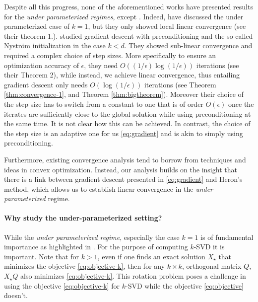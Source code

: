 Despite all this progress, none of the aforementioned works have presented results for the \emph{under parameterized regimes}, except \cite{chi2019nonconvex,li2024crucial}. Indeed, \cite{chi2019nonconvex} have discussed the under parameterized case of $k = 1$, but they only showed local linear convergence (see their theorem 1.). \cite{li2024crucial} studied gradient descent with preconditioning and the so-called Nyström initialization in the case $k < d$. They showed sub-linear convergence and required a complex choice of step sizes. More specifically to ensure an optimization accuracy of $\epsilon$, they need $O((1/\epsilon)\log(1/\epsilon))$ iterations (see their Theorem 2), while instead, we achieve linear convergence, thus entailing gradient descent only needs $O(\log(1/\epsilon))$ iterations (see Theorem \ref{thm:convergence-1}, and Theorem \ref{thm:bigtheorem}). Moreover their choice of the step size has to switch from a constant to one that is of order $O(\epsilon)$ once the iterates are sufficiently close to the global solution while using preconditioning at the same time. It is not clear how this can be achieved. In contrast, the choice of the step size is an adaptive one for us \eqref{eq:gradient} and is akin to simply using preconditioning.


Furthermore, existing convergence analysis tend to borrow from techniques and ideas in convex optimization. Instead, our analysis builds on the insight that there is a link between gradient descent presented in \eqref{eq:gradient} and Heron's method, which allows us to establish linear convergence in the \emph{under-parameterized} regime.  


\paragraph{Why study the under-parameterized setting?} While the \emph{under parameterized regime}, especially the case $k = 1$ is of fundamental importance as highlighted in \cite{chi2019nonconvex}. For the purpose of computing $k$-SVD it is important. Note that for $k > 1$, even if one finds an exact solution $X_\star$ that minimizes the objective \eqref{eq:objective-k}, then for any $k \times k$, orthogonal matrix $Q$, $X_\star Q$ also minimizes \eqref{eq:objective-k}. This rotation problem poses a challenge in using the objective \eqref{eq:objective-k} for $k$-SVD while the objective \eqref{eq:objective} doesn't. 
